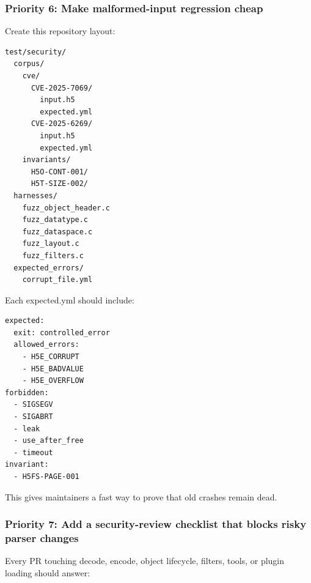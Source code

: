 \documentclass[../main.tex]{subfiles}
\begin{document}
\subsubsection*{Priority 6: Make malformed-input regression cheap}

Create this repository layout:
\begin{verbatim}
test/security/
  corpus/
    cve/
      CVE-2025-7069/
        input.h5
        expected.yml
      CVE-2025-6269/
        input.h5
        expected.yml
    invariants/
      H5O-CONT-001/
      H5T-SIZE-002/
  harnesses/
    fuzz_object_header.c
    fuzz_datatype.c
    fuzz_dataspace.c
    fuzz_layout.c
    fuzz_filters.c
  expected_errors/
    corrupt_file.yml
\end{verbatim}

Each expected.yml should include:
\begin{verbatim}
expected:
  exit: controlled_error
  allowed_errors:
    - H5E_CORRUPT
    - H5E_BADVALUE
    - H5E_OVERFLOW
forbidden:
  - SIGSEGV
  - SIGABRT
  - leak
  - use_after_free
  - timeout
invariant:
  - H5FS-PAGE-001
\end{verbatim}

This gives maintainers a fast way to prove that old crashes remain dead.

\subsubsection*{Priority 7: Add a security-review checklist that blocks risky parser changes}

Every PR touching decode, encode, object lifecycle, filters, tools, or plugin
loading should answer:

\begingroup
\small
\setlength{\tabcolsep}{3pt}
\renewcommand{\arraystretch}{1.15}
\end{document}
